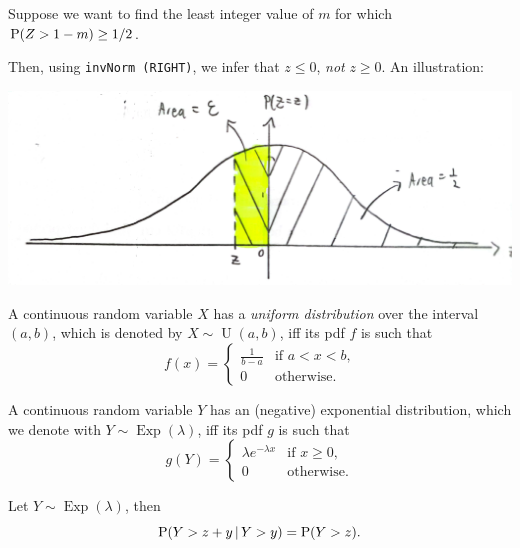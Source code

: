 \documentclass[../Notes.tex]{subfiles}
\begin{document}
\begin{example}{}{}
  Suppose we want to find the least integer value of \(m\) for which \(\operatorname{P}(Z>1-m)\geq 1/2\).

  Then, using \texttt{invNorm (RIGHT)}, we infer that \(z\leq 0\), \emph{not} \(z\geq 0\). An illustration: 
  \begin{center}
    \includegraphics[width=\textwidth]{../images/Special-Continuous-Random-Variables-Example-Illustration.jpg}
  \end{center}
\end{example}
\begin{definition}{}
  A continuous random variable \(X\) has a \emph{uniform distribution} over the interval \((a,b)\), which is denoted by \(X \sim \operatorname{U}(a,b)\), iff its pdf \(f\) is such that
    \[f(x)=\begin{cases}
      \frac{1}{b-a} &\text{if \(a<x<b\),}\\
      0 &\text{otherwise.}
    \end{cases}\] 
\end{definition}
\begin{definition}{}
  A continuous random variable \(Y\) has an (negative) exponential distribution, which we denote with \(Y\sim \operatorname{Exp}(\lambda)\), iff its pdf \(g\) is such that
    \[g(Y)=
    \begin{cases}
      \lambda e^{-\lambda x} &\text{if \(x\geq 0\)},\\
      0 &\text{otherwise.}
    \end{cases}\]
\end{definition}
\begin{note}
  Let \(Y \sim \operatorname{Exp}(\lambda)\), then
  \[\operatorname{P}(Y>z+y \,\vert\, Y>y)=\operatorname{P}(Y>z).\]
\end{note}
\end{document}
